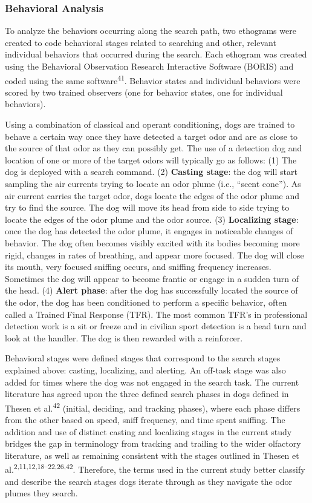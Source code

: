\documentclass[
]{article}
\begin{document}
\hypertarget{behavioral-analysis}{%
\subsubsection{Behavioral Analysis}\label{behavioral-analysis}}

To analyze the behaviors occurring along the search path, two ethograms were created to code behavioral stages related to searching and other, relevant individual behaviors that occurred during the search. Each ethogram was created using the Behavioral Observation Research Interactive Software (BORIS) and coded using the same software\textsuperscript{41}. Behavior states and individual behaviors were scored by two trained observers (one for behavior states, one for individual behaviors).

Using a combination of classical and operant conditioning, dogs are trained to behave a certain way once they have detected a target odor and are as close to the source of that odor as they can possibly get. The use of a detection dog and location of one or more of the target odors will typically go as follows: (1) The dog is deployed with a search command. (2) \textbf{Casting stage}: the dog will start sampling the air currents trying to locate an odor plume (i.e., ``scent cone''). As air current carries the target odor, dogs locate the edges of the odor plume and try to find the source. The dog will move its head from side to side trying to locate the edges of the odor plume and the odor source. (3) \textbf{Localizing stage}: once the dog has detected the odor plume, it engages in noticeable changes of behavior. The dog often becomes visibly excited with its bodies becoming more rigid, changes in rates of breathing, and appear more focused. The dog will close its mouth, very focused sniffing occurs, and sniffing frequency increases. Sometimes the dog will appear to become frantic or engage in a sudden turn of the head. (4) \textbf{Alert phase}: after the dog has successfully located the source of the odor, the dog has been conditioned to perform a specific behavior, often called a Trained Final Response (TFR). The most common TFR's in professional detection work is a sit or freeze and in civilian sport detection is a head turn and look at the handler. The dog is then rewarded with a reinforcer.

Behavioral stages were defined stages that correspond to the search stages explained above: casting, localizing, and alerting. An off-task stage was also added for times where the dog was not engaged in the search task. The current literature has agreed upon the three defined search phases in dogs defined in Thesen et al.\textsuperscript{42} (initial, deciding, and tracking phases), where each phase differs from the other based on speed, sniff frequency, and time spent sniffing. The addition and use of distinct casting and localizing stages in the current study bridges the gap in terminology from tracking and trailing to the wider olfactory literature, as well as remaining consistent with the stages outlined in Thesen et al.\textsuperscript{2,11,12,18--22,26,42}. Therefore, the terms used in the current study better classify and describe the search stages dogs iterate through as they navigate the odor plumes they search.
\end{document}
